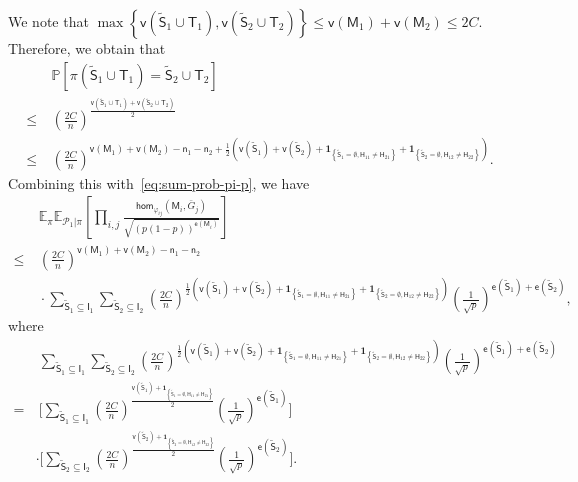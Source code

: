 \documentclass[letterpaper,11pt]{article}
\theoremstyle{definition}
\newcommand{\maP}{\mathcal{P}}
\newcommand{\prob}[1]{ \mathbb{P}\left[ #1 \right] }
\newcommand{\en}{\mathsf{{e}}}
\newcommand{\vn}{\mathsf{{v}}}
\newcommand{\pth}[1]{\left( #1 \right)}
\newcommand{\qth}[1]{\left[ #1 \right]}
\newcommand{\sth}[1]{\left\{ #1 \right\}}
\newcommand{\ti}{\tilde}
\newcommand{\sfH}{{\mathsf{H}}}
\newcommand{\sfI}{{\mathsf{I}}}
\newcommand{\sfM}{{\mathsf{M}}}
\newcommand{\sfS}{{\mathsf{S}}}
\newcommand{\sfT}{{\mathsf{T}}}
\newcommand{\sfn}{{\mathsf{n}}}
\newcommand{\indc}[1]{{\mathbf{1}_{\left\{{#1}\right\}}}}
\renewcommand{\hom}{\mathsf{hom}}
\newcommand{\vp}{\varphi}
\def\E{\mathbb{E}}
\begin{document}
We note that $\max\sth{\vn(\ti{\sfS}_1\cup \sfT_1),\vn(\ti{\sfS}_2\cup \sfT_2)}\le \vn(\sfM_1)+\vn(\sfM_2)\le 2C$.  Therefore, we obtain that \begin{align*}
    &~\prob{\pi(\ti{\sfS}_1\cup \sfT_1) = \ti{\sfS}_2\cup \sfT_2}\\\le&~ \pth{\frac{2C}{n}}^{\frac{\vn(\ti{\sfS}_1\cup \sfT_1)+\vn(\ti{\sfS}_2\cup \sfT_2)}{2}}\\\le&~ \pth{\frac{2C}{n}}^{\vn(\sfM_1)+\vn(\sfM_2)-\sfn_1-\sfn_2+\frac{1}{2}\pth{\vn(\ti{\sfS}_1)+\vn(\ti{\sfS}_2)+\indc{\ti{\sfS}_1=\emptyset, \sfH_{11}\neq \sfH_{21}}+\indc{\ti{\sfS}_2=\emptyset, \sfH_{12}\neq \sfH_{22}}}}.
\end{align*}
Combining this with~\eqref{eq:sum-prob-pi-p}, we have \begin{align}
    \nonumber &~\E_\pi\E_{\maP_1|\pi}\qth{\prod_{i,j}\frac{\hom_{\vp_{ij}}(\sfM_i,\bar{G}_j)}{\sqrt{(p(1-p))^{\en(\sfM_i)}}}}
    \\\nonumber \le&~\pth{\frac{2C}{n}}^{\vn(\sfM_1)+\vn(\sfM_2)-\sfn_1-\sfn_2} \\\label{eq:upbd-vp-term-PhiB}&~\cdot\sum_{\ti{\sfS}_1\subseteq \sfI_1}\sum_{\ti{\sfS}_2\subseteq \sfI_2} \pth{\frac{2C}{n}}^{\frac{1}{2}\pth{\vn(\ti{\sfS}_1)+\vn(\ti{\sfS}_2)+\indc{\ti{\sfS}_1=\emptyset, \sfH_{11}\neq \sfH_{21}}+\indc{\ti{\sfS}_2=\emptyset, \sfH_{12}\neq \sfH_{22}}}}\pth{\frac{1}{\sqrt{p}}}^{\en(\ti{\sfS}_1)+\en(\ti{\sfS}_2)},
\end{align}
where \begin{align*}
    &~\sum_{\ti{\sfS}_1\subseteq \sfI_1}\sum_{\ti{\sfS}_2\subseteq \sfI_2} \pth{\frac{2C}{n}}^{\frac{1}{2}\pth{\vn(\ti{\sfS}_1)+\vn(\ti{\sfS}_2)+\indc{\ti{\sfS}_1=\emptyset, \sfH_{11}\neq \sfH_{21}}+\indc{\ti{\sfS}_2=\emptyset, \sfH_{12}\neq \sfH_{22}}}}\pth{\frac{1}{\sqrt{p}}}^{\en(\ti{\sfS}_1)+\en(\ti{\sfS}_2)}\\
    =&~\Bigg[\sum_{\ti{\sfS}_1\subseteq \sfI_1} \pth{\frac{2C}{n}}^{\frac{\vn(\ti{\sfS}_1)+\indc{\ti{\sfS}_1 = \emptyset, \sfH_{11}\neq \sfH_{21}}}{2}} \pth{\frac{1}{\sqrt{p}}}^{\en(\ti{\sfS}_1)}\Bigg]\\&\cdot \Bigg[\sum_{\ti{\sfS}_2\subseteq \sfI_2} \pth{\frac{2C}{n}}^{\frac{\vn(\ti{\sfS}_2)+\indc{\ti{\sfS}_2 = \emptyset, \sfH_{12}\neq \sfH_{22}}}{2}} \pth{\frac{1}{\sqrt{p}}}^{\en(\ti{\sfS}_2)}\Bigg].
\end{align*}
\end{document}
